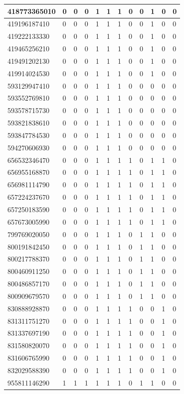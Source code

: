 \documentclass[12pt]{article}
\numberwithin{equation}{section} %
\begin{document}
\begin{center}
\begin{longtable}{|l|llll|ll|lllll|}
418773365010&0&0&0&1&1&1&0&0&1&0&0\\ \hline
419196187410&0&0&0&1&1&1&0&0&1&0&0\\ \hline
419222133330&0&0&0&1&1&1&0&0&1&0&0\\ \hline
419465256210&0&0&0&1&1&1&0&0&1&0&0\\ \hline
419491202130&0&0&0&1&1&1&0&0&1&0&0\\ \hline
419914024530&0&0&0&1&1&1&0&0&1&0&0\\ \hline
593129947410&0&0&0&1&1&1&0&0&0&0&0\\ \hline
593552769810&0&0&0&1&1&1&0&0&0&0&0\\ \hline
593578715730&0&0&0&1&1&1&0&0&0&0&0\\ \hline
593821838610&0&0&0&1&1&1&0&0&0&0&0\\ \hline
593847784530&0&0&0&1&1&1&0&0&0&0&0\\ \hline
594270606930&0&0&0&1&1&1&0&0&0&0&0\\ \hline
656532346470&0&0&0&1&1&1&1&0&1&1&0\\ \hline
656955168870&0&0&0&1&1&1&1&0&1&1&0\\ \hline
656981114790&0&0&0&1&1&1&1&0&1&1&0\\ \hline
657224237670&0&0&0&1&1&1&1&0&1&1&0\\ \hline
657250183590&0&0&0&1&1&1&1&0&1&1&0\\ \hline
657673005990&0&0&0&1&1&1&1&0&1&1&0\\ \hline
799769020050&0&0&0&1&1&1&0&1&1&0&0\\ \hline
800191842450&0&0&0&1&1&1&0&1&1&0&0\\ \hline
800217788370&0&0&0&1&1&1&0&1&1&0&0\\ \hline
800460911250&0&0&0&1&1&1&0&1&1&0&0\\ \hline
800486857170&0&0&0&1&1&1&0&1&1&0&0\\ \hline
800909679570&0&0&0&1&1&1&0&1&1&0&0\\ \hline
830888928870&0&0&0&1&1&1&1&0&0&1&0\\ \hline
831311751270&0&0&0&1&1&1&1&0&0&1&0\\ \hline
831337697190&0&0&0&1&1&1&1&0&0&1&0\\ \hline
831580820070&0&0&0&1&1&1&1&0&0&1&0\\ \hline
831606765990&0&0&0&1&1&1&1&0&0&1&0\\ \hline
832029588390&0&0&0&1&1&1&1&0&0&1&0\\ \hline
955811146290&1&1&1&1&1&1&0&1&1&0&0\\ \hline

\end{longtable}
\end{center}
\end{document}
